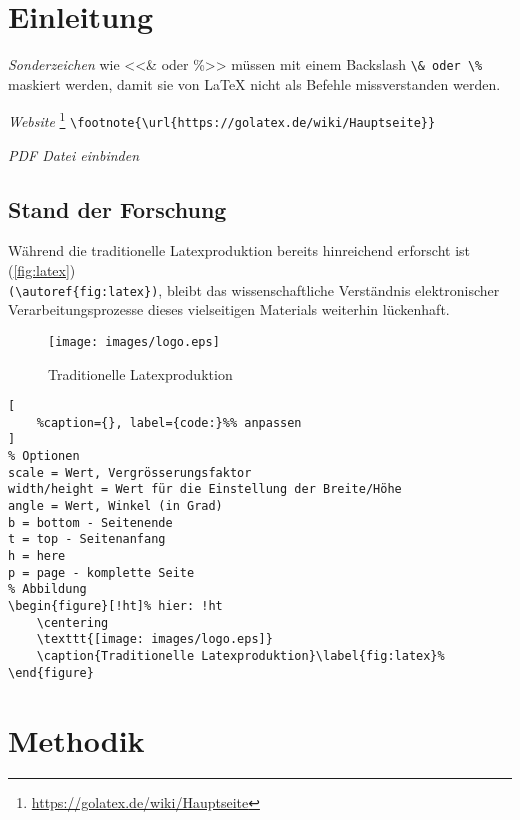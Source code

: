 \section*{Einleitung}

\emph{Sonderzeichen}  wie <<\& oder \%>> müssen mit einem Backslash \verb|\& oder \%| maskiert werden, 
damit sie von LaTeX nicht als Befehle missverstanden werden.


\emph{Website} \footnote{\url{https://golatex.de/wiki/Hauptseite}} \verb|\footnote{\url{https://golatex.de/wiki/Hauptseite}}| 

\emph{PDF Datei einbinden} \verb|| 
 

\clearpage
\subsection*{Stand der Forschung}

Während die traditionelle Latexproduktion bereits hinreichend erforscht ist (\autoref{fig:latex}) \\
\verb|(\autoref{fig:latex})|, bleibt das wissenschaftliche Verständnis elektronischer Verarbeitungsprozesse dieses 
vielseitigen Materials weiterhin lückenhaft. 


\begin{figure}[!ht]%
	\centering
	\texttt{[image: images/logo.eps]}
	\caption{Traditionelle Latexproduktion}\label{fig:latex}%
\end{figure}

\lstset{language=TeX}%
\begin{lstlisting}[
	%caption={}, label={code:}%% anpassen
]
% Optionen
scale = Wert, Vergrösserungsfaktor
width/height = Wert für die Einstellung der Breite/Höhe
angle = Wert, Winkel (in Grad)
b = bottom - Seitenende 
t = top - Seitenanfang
h = here
p = page - komplette Seite  
% Abbildung
\begin{figure}[!ht]% hier: !ht
	\centering
	\texttt{[image: images/logo.eps]}
	\caption{Traditionelle Latexproduktion}\label{fig:latex}%
\end{figure}
\end{lstlisting}


\clearpage
\section*{Methodik}

